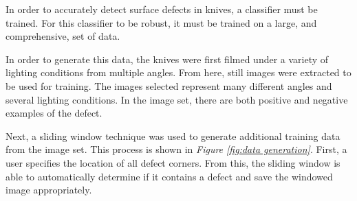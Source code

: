 \documentclass[letterpaper, 10 pt, conference]{ieeeconf}  %
\begin{document}
In order to accurately detect surface defects in knives, a classifier must be trained. For this classifier to be robust, it must be trained on a large, and comprehensive, set of data.

In order to generate this data, the knives were first filmed under a variety of lighting conditions from multiple angles. From here, still images were extracted to be used for training. The images selected represent many different angles and several lighting conditions. In the image set, there are both positive and negative examples of the defect.

Next, a sliding window technique was used to generate additional training data from the image set. This process is shown in \textit{Figure \ref{fig:data generation}}. First, a user specifies the location of all defect corners. From this, the sliding window is able to automatically determine if it contains a defect and save the windowed image appropriately.
\end{document}
